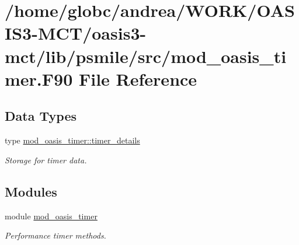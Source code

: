 \hypertarget{mod__oasis__timer_8_f90}{}\section{/home/globc/andrea/\+W\+O\+R\+K/\+O\+A\+S\+I\+S3-\/\+M\+C\+T/oasis3-\/mct/lib/psmile/src/mod\+\_\+oasis\+\_\+timer.F90 File Reference}
\label{mod__oasis__timer_8_f90}
\subsection*{Data Types}
\begin{DoxyCompactItemize}
\item 
type \hyperlink{structmod__oasis__timer_1_1timer__details}{mod\+\_\+oasis\+\_\+timer\+::timer\+\_\+details}
\begin{DoxyCompactList}\small\item\em Storage for timer data. \end{DoxyCompactList}\end{DoxyCompactItemize}
\subsection*{Modules}
\begin{DoxyCompactItemize}
\item 
module \hyperlink{namespacemod__oasis__timer}{mod\+\_\+oasis\+\_\+timer}
\begin{DoxyCompactList}\small\item\em Performance timer methods. \end{DoxyCompactList}\end{DoxyCompactItemize}
